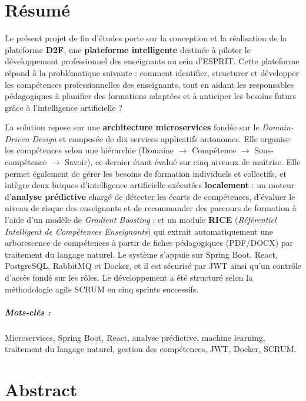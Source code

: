 \documentclass[12pt,a4paper]{report}
\begin{document}
\chapter*{Résumé}
\thispagestyle{plain}

Le présent projet de fin d'études porte sur la conception et la réalisation de la
plateforme \textbf{D2F}, une \textbf{plateforme intelligente} destinée à piloter
le développement professionnel des enseignants au sein d'ESPRIT. Cette plateforme
répond à la problématique suivante : comment identifier, structurer et développer
les compétences professionnelles des enseignants, tout en aidant les responsables
pédagogiques à planifier des formations adaptées et à anticiper les besoins futurs
grâce à l'intelligence artificielle ?

La solution repose sur une \textbf{architecture microservices} fondée sur le
\textit{Domain-Driven Design} et composée de dix services applicatifs autonomes.
Elle organise les compétences selon une hiérarchie
(Domaine $\rightarrow$ Compétence $\rightarrow$ Sous-compétence $\rightarrow$ Savoir),
ce dernier étant évalué sur cinq niveaux de maîtrise. Elle permet également de
gérer les besoins de formation individuels et collectifs, et intègre deux briques
d'intelligence artificielle exécutées \textbf{localement} : un moteur
d'\textbf{analyse prédictive} chargé de détecter les écarts de compétences,
d'évaluer le niveau de risque des enseignants et de recommander des parcours de
formation à l'aide d'un modèle de \textit{Gradient Boosting} ; et un module
\textbf{RICE} (\textit{Référentiel Intelligent de Compétences Enseignants}) qui
extrait automatiquement une arborescence de compétences à partir de fiches
pédagogiques (PDF/DOCX) par traitement du langage naturel. Le système s'appuie sur
Spring Boot, React, PostgreSQL, RabbitMQ et Docker, et il est sécurisé par JWT
ainsi qu'un contrôle d'accès fondé sur les rôles. Le développement a été structuré
selon la méthodologie agile SCRUM en cinq sprints successifs.

\paragraph{Mots-clés :} Microservices, Spring Boot, React, analyse prédictive,
machine learning, traitement du langage naturel, gestion des compétences, JWT,
Docker, SCRUM.

\clearpage
\chapter*{Abstract}
\thispagestyle{plain}
\end{document}
